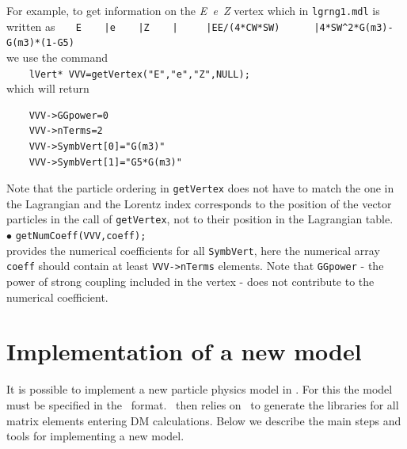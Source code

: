 \documentclass[12pt,a4paper]{article}
\begin{document}
For example, to get information on the {\it E~e~Z}   vertex which in  {\tt lgrng1.mdl} is written as
\verb!   E    |e    |Z    |     |EE/(4*CW*SW)      |4*SW^2*G(m3)-G(m3)*(1-G5) !\\
we use the command \\
\verb|    lVert* VVV=getVertex("E","e","Z",NULL); |\\
which will return
\begin{verbatim}
    VVV->GGpower=0 
    VVV->nTerms=2
    VVV->SymbVert[0]="G(m3)"
    VVV->SymbVert[1]="G5*G(m3)" 
\end{verbatim}
Note that the particle ordering in {\tt getVertex} does not have to match the one in the Lagrangian and  the Lorentz index corresponds to the position of the vector particles in the call of {\tt getVertex}, not to their position in the Lagrangian table.\\
 $\bullet$ \verb|getNumCoeff(VVV,coeff);| \\  
provides the 
numerical coefficients  for all {\tt SymbVert},
here the numerical  array {\tt coeff} should contain at least {\tt VVV->nTerms} elements. Note that {\tt GGpower} -  the  power of strong coupling included in the vertex -  does not contribute to the numerical coefficient.



\section{Implementation of  a new model}

\label{sec:newmodel}

It is possible to  implement a new particle physics  model  in \micro.
For this the model must be specified in the
\calchep\ format. \micro\ then relies on \calchep\ 
to generate the libraries for all matrix elements entering DM calculations. 
Below we describe the main steps and tools for implementing a new model.
\end{document}
